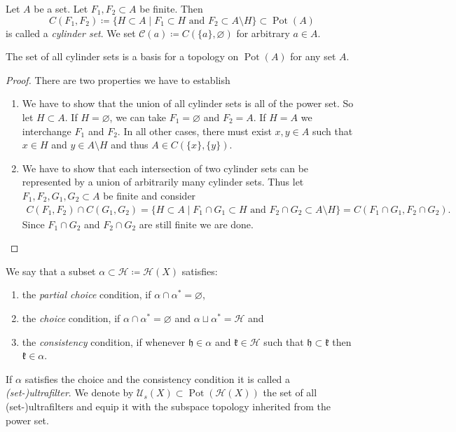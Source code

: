 \begin{defin}
  \label{def:pot-top}
  Let \(A\) be a set. Let \(F_1, F_2 \subset A\) be finite. Then
  \[
    C(F_1, F_2) \coloneqq \{ H \subset A \mid F_1 \subset H \text{ and } F_2 \subset A \setminus H\} \subset \operatorname{Pot}(A)
  \]
  is called a \emph{cylinder set}. We set \(\mathcal{C}(a) \coloneqq C(\{a\}, \varnothing)\) for arbitrary \(a \in A\).
\end{defin}

\begin{prop}
  \label{prop:pot-top}
  The set of all cylinder sets is a basis for a topology on \(\operatorname{Pot}(A)\) for any set \(A\).
\end{prop}

\begin{proof}
  There are two properties we have to establish
  \begin{enumerate}
  \item We have to show that the union of all cylinder sets is all of the power set. So let \(H \subset A\). If \(H = \varnothing\), we can take \(F_1 = \varnothing\) and \(F_2 = A\). If \(H = A\) we interchange \(F_1\) and \(F_2\). In all other cases, there must exist \(x,y \in A\) such that \(x \in H\) and \(y \in A \setminus H\) and thus \(A \in C(\{x\}, \{y\})\).
  \item We have to show that each intersection of two cylinder sets can be represented by a union of arbitrarily many cylinder sets. Thus let \(F_1, F_2, G_1, G_2 \subset A\) be finite and consider
  \begin{align*}
    C(F_1, F_2) \cap C(G_1, G_2)
     = \{H \subset A \mid F_1 \cap G_1 \subset H \text{ and } F_2 \cap G_2 \subset A \setminus H\} = C(F_1 \cap G_1, F_2 \cap G_2).
  \end{align*}
  Since \(F_1 \cap G_2\) and \(F_2 \cap G_2\) are still finite we are done.
  \end{enumerate}
\end{proof}

\begin{defin}
  We say that a subset \(\alpha \subset \mathcal{H} \coloneqq \mathcal{H}(X)\) satisfies:
  \begin{enumerate}
  \item the \emph{partial choice} condition, if \(\alpha \cap \alpha^\ast = \varnothing\),
  \item the \emph{choice} condition, if \(\alpha \cap \alpha^\ast = \varnothing\) and \(\alpha \sqcup \alpha^\ast = \mathcal{H}\) and
  \item the \emph{consistency} condition, if whenever \(\mathfrak{h} \in \alpha\) and \(\mathfrak{k} \in \mathcal{H}\) such that \(\mathfrak{h} \subset \mathfrak{k}\) then \(\mathfrak{k} \in \alpha\).
  \end{enumerate}
  If \(\alpha\) satisfies the choice and the consistency condition it is called a \emph{(set-)ultrafilter}. We denote by \(\mathcal{U}_s(X) \subset \operatorname{Pot}(\mathcal{H}(X))\) the set of all (set-)ultrafilters and equip it with the subspace topology inherited from the power set.
\end{defin}


